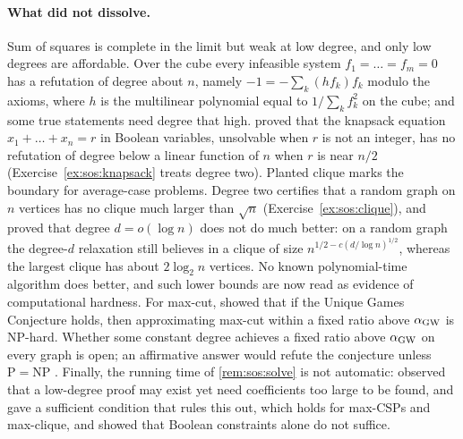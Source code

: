 \begin{refsection}
\paragraph{What did not dissolve.} Sum of squares is complete in the limit but weak at low degree, and only low degrees are affordable. Over the cube every infeasible system $f_1=\dots=f_m=0$ has a refutation of degree about $n$, namely $-1=-\sum_k(hf_k)f_k$ modulo the axioms, where $h$ is the multilinear polynomial equal to $1/\sum_kf_k^2$ on the cube; and some true statements need degree that high. \textcite{Grigoriev2001} proved that the knapsack equation $x_1+\dots+x_n=r$ in Boolean variables, unsolvable when $r$ is not an integer, has no refutation of degree below a linear function of $n$ when $r$ is near $n/2$ (Exercise~\ref{ex:sos:knapsack} treats degree two). Planted clique marks the boundary for average-case problems. Degree two certifies that a random graph on $n$ vertices has no clique much larger than $\sqrt n$ (Exercise~\ref{ex:sos:clique}), and \textcite{Barak2016} proved that degree $d=o(\log n)$ does not do much better: on a random graph the degree-$d$ relaxation still believes in a clique of size $n^{1/2-c(d/\log n)^{1/2}}$, whereas the largest clique has about $2\log_2n$ vertices. No known polynomial-time algorithm does better, and such lower bounds are now read as evidence of computational hardness. For max-cut, \textcite{Khot2007} showed that if the Unique Games Conjecture holds, then approximating max-cut within a fixed ratio above $\alpha_{\mathrm{GW}}$ is NP-hard. Whether some constant degree achieves a fixed ratio above $\alpha_{\mathrm{GW}}$ on every graph is open; an affirmative answer would refute the conjecture unless $\mathrm{P}=\mathrm{NP}$ \parencite{BarakSteurer2014}. Finally, the running time of \cref{rem:sos:solve} is not automatic: \textcite{ODonnell2017} observed that a low-degree proof may exist yet need coefficients too large to be found, and \textcite{RaghavendraWeitz2017} gave a sufficient condition that rules this out, which holds for max-CSPs and max-clique, and showed that Boolean constraints alone do not suffice.


\end{refsection}
